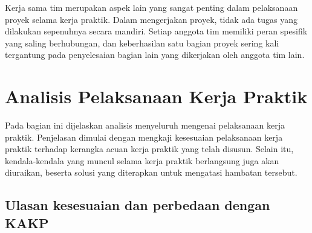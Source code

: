 Kerja sama tim merupakan aspek lain yang sangat penting dalam pelaksanaan proyek selama kerja praktik. Dalam mengerjakan proyek, tidak ada tugas yang dilakukan sepenuhnya secara mandiri. Setiap anggota tim memiliki peran spesifik yang saling berhubungan, dan keberhasilan satu bagian proyek sering kali tergantung pada penyelesaian bagian lain yang dikerjakan oleh anggota tim lain.

\section{Analisis Pelaksanaan Kerja Praktik}

Pada bagian ini dijelaskan analisis menyeluruh mengenai pelaksanaan kerja praktik. Penjelasan dimulai dengan mengkaji kesesuaian pelaksanaan kerja praktik terhadap kerangka acuan kerja praktik yang telah disusun. Selain itu, kendala-kendala yang muncul selama kerja praktik berlangsung juga akan diuraikan, beserta solusi yang diterapkan untuk mengatasi hambatan tersebut.

\newpage

\subsection{Ulasan kesesuaian dan perbedaan dengan KAKP}

